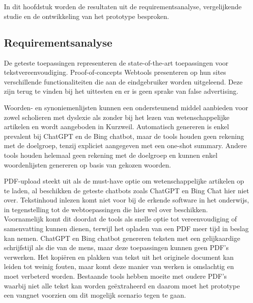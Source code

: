
\chapter{}%
\label{ch:discussie}

In dit hoofdstuk worden de resultaten uit de requirementsanalyse, vergelijkende studie en de ontwikkeling van het prototype besproken. 

\section{Requirementsanalyse}


De geteste toepassingen representeren de state-of-the-art toepassingen voor tekstvereenvoudiging. Proof-of-concepts Webtools presenteren op hun sites verschillende functionaliteiten die aan de eindgebruiker worden uitgeleend. Deze zijn terug te vinden bij het uittesten en er is geen sprake van false advertising. 


Woorden- en synoniemenlijsten kunnen een ondersteunend middel aanbieden voor zowel scholieren met dyslexie als zonder bij het lezen van wetenschappelijke artikelen en wordt aangeboden in Kurzweil. Automatisch genereren is enkel prevalent bij ChatGPT en de Bing chatbot, maar de tools houden geen rekening met de doelgroep, tenzij expliciet aangegeven met een one-shot summary. Andere tools houden helemaal geen rekening met de doelgroep en kunnen enkel woordenlijsten genereren op basis van gekozen woorden.

\medspace

PDF-upload steekt uit als de must-have optie om wetenschappelijke artikelen op te laden, al beschikken de geteste chatbots zoals ChatGPT en Bing Chat hier niet over. Tekstinhoud inlezen komt niet voor bij de erkende software in het onderwijs, in tegenstelling tot de webtoepassingen die hier wel over beschikken. Voornamelijk komt dit doordat de tools als snelle optie tot vereenvoudiging of samenvatting kunnen dienen, terwijl het opladen van een PDF meer tijd in beslag kan nemen. ChatGPT en Bing chatbot genereren teksten met een gelijkaardige schrijfstijl als die van de mens, maar deze toepassingen kunnen geen PDF's verwerken. Het kopiëren en plakken van tekst uit het originele document kan leiden tot weinig fouten, maar komt deze manier van werken is omslachtig en moet verbeterd worden. Bestaande tools hebben moeite met oudere PDF's waarbij niet alle tekst kan worden geëxtraheerd en daarom moet het prototype een vangnet voorzien om dit mogelijk scenario tegen te gaan.

